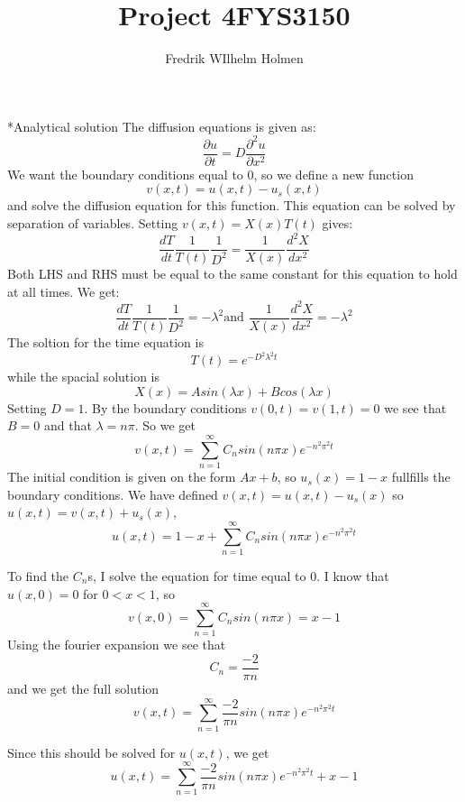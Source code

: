 \documentclass[a4paper, 12pt, titlepage]{article}
\author{Fredrik WIlhelm Holmen}
\title{Project 4}
\title{FYS3150}
\newcommand{\f}[2]{\frac{#1}{#2}}
\newcommand{\beq}{\begin{equation*}}
\newcommand{\eeq}{\end{equation*}}
\begin{document}
  \maketitle
  \newpage
  \begin{section}*{Analytical solution}
    The diffusion equations is given as: \beq \f{\partial u}{\partial t} = D\f{\partial ^2u}{\partial x^2}\eeq
    We want the boundary conditions equal to $0$, so we define a new function \beq v(x,t) = u(x,t) - u_s(x,t) \eeq
    and solve the diffusion equation for this function. This equation can be solved by separation of
    variables. Setting $v(x,t) = X(x)T(t)$ gives:
    \beq \f{dT}{dt} \f{1}{T(t)} \f{1}{D^2} = \f{1}{X(x)} \f{d^2 X}{dx^2}\eeq
    Both LHS and RHS must be equal to the same constant for this equation to hold at all times. We get:
    \beq \f{dT}{dt} \f{1}{T(t)} \f{1}{D^2} = -\lambda ^2 \text{and }\f{1}{X(x)} \f{d^2 X}{dx^2} = -\lambda ^2 \eeq 
    The soltion for the time equation is \beq T(t) = e^{-D^2\lambda ^2 t} \eeq while the spacial solution is
    \beq X(x) = Asin(\lambda x) + Bcos(\lambda x) \eeq
    Setting $ D = 1$.
    By the boundary conditions $v(0,t) = v(1,t) = 0$ we see that $B = 0$ and that $\lambda = n\pi$. 
    So we get \beq v(x,t) = \sum_{n=1}^{\infty} C_n sin(n\pi x) e^{-n^2\pi ^2 t} \eeq
    The initial condition is given on the form $Ax + b$, so $u_s(x) = 1-x$ fullfills the boundary conditions. 
    We have defined $v(x,t) = u(x,t) - u_s(x)$ so $u(x,t) = v(x,t) + u_s(x)$, 
    \beq u(x,t) = 1 - x + \sum_{n=1}^{\infty} C_n sin(n\pi x)e^{-n^2\pi ^2 t}  \eeq 
    
    To find the $C_n$s, I solve the equation for time equal to 0. I know that $u(x,0) = 0$ for $0<x<1$, so
    \beq v(x,0) = \sum_{n=1}^{\infty} C_n sin(n\pi x) = x - 1 \eeq
    Using the fourier expansion we see that \beq C_n = \f{-2}{\pi n} \eeq and we get the full solution
    \beq v(x,t) = \sum_{n=1}^{\infty} \f{-2}{\pi n} sin(n\pi x) e^{-n^2\pi ^2 t} \eeq
    
    Since this should be solved for $u(x,t)$, we get
    \beq u(x,t) = \sum_{n=1}^{\infty} \f{-2}{\pi n} sin(n\pi x) e^{-n^2\pi ^2 t} + x - 1 \eeq
    
  \end{section}
    
  
  
\end{document}
